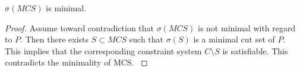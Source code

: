 \begin{lemma} $\sigma(MCS)$ is minimal.
\begin{proof}
Assume toward contradiction that $\sigma(MCS)$ is not minimal with regard to $P$. Then there exists $S \subset MCS$ such that $\sigma(S)$ is a minimal cut set of $P$. This implies that the corresponding constraint system $C \setminus S$ is satisfiable. This contradicts the minimality of MCS.
\label{lemma:min}
\end{proof}
\end{lemma}




